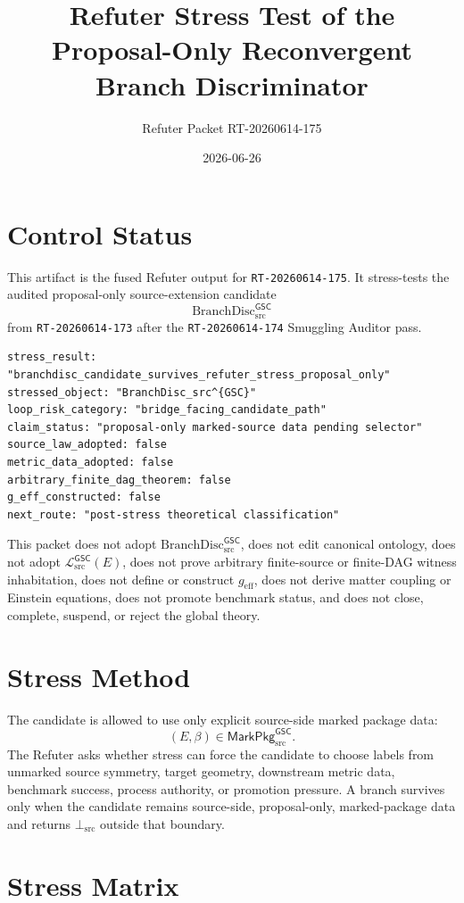 \documentclass[11pt]{article}
\title{Refuter Stress Test of the Proposal-Only Reconvergent Branch Discriminator}
\author{Refuter Packet RT-20260614-175}
\date{2026-06-26}
\newcommand{\MetricData}{\mathcal{L}_{\mathrm{src}}^{\mathsf{GSC}}}
\newcommand{\BottomSrc}{\bot_{\mathrm{src}}}
\newcommand{\geff}{g_{\mathrm{eff}}}
\newcommand{\BranchDisc}{\mathrm{BranchDisc}_{\mathrm{src}}^{\mathsf{GSC}}}
\newcommand{\MarkedPkg}{\mathsf{MarkPkg}_{\mathrm{src}}^{\mathsf{GSC}}}
\begin{document}
\maketitle

\section{Control Status}

This artifact is the fused Refuter output for \texttt{RT-20260614-175}. It
stress-tests the audited proposal-only source-extension candidate
\[
  \BranchDisc
\]
from \texttt{RT-20260614-173} after the \texttt{RT-20260614-174} Smuggling
Auditor pass.

\begin{verbatim}
stress_result: "branchdisc_candidate_survives_refuter_stress_proposal_only"
stressed_object: "BranchDisc_src^{GSC}"
loop_risk_category: "bridge_facing_candidate_path"
claim_status: "proposal-only marked-source data pending selector"
source_law_adopted: false
metric_data_adopted: false
arbitrary_finite_dag_theorem: false
g_eff_constructed: false
next_route: "post-stress theoretical classification"
\end{verbatim}

This packet does not adopt \(\BranchDisc\), does not edit canonical ontology,
does not adopt \(\MetricData(E)\), does not prove arbitrary finite-source or
finite-DAG witness inhabitation, does not define or construct \(\geff\), does
not derive matter coupling or Einstein equations, does not promote benchmark
status, and does not close, complete, suspend, or reject the global theory.

\section{Stress Method}

The candidate is allowed to use only explicit source-side marked package data:
\[
  (E,\beta)\in\MarkedPkg.
\]
The Refuter asks whether stress can force the candidate to choose labels from
unmarked source symmetry, target geometry, downstream metric data, benchmark
success, process authority, or promotion pressure. A branch survives only when
the candidate remains source-side, proposal-only, marked-package data and
returns \(\BottomSrc\) outside that boundary.

\section{Stress Matrix}
\end{document}

